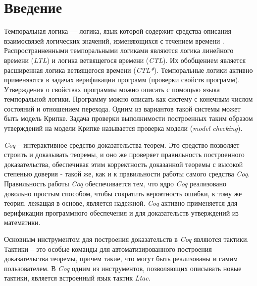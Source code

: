 \documentclass[12pt]{article}
\begin{document}
  \mdissPutTitleContents

  \section{Введение}
  
  
Темпоральная логика — логика, язык которой содержит средства описания взаимосвязей логических значений, изменяющихся с течением времени \cite{Clark}. Распространненными темпоральными логиками являются логика линейного времени (\textit{LTL}) и логика ветвящегося времени (\textit{CTL}). Их обобщением является расширенная логика ветвящегося времени (\textit{CTL*}). Темпоральные логики активно применяются в задачах верификации программ (проверки свойств программ). Утверждения о свойствах программы можно описать с помощью языка темпоральной логики. 
Программу можно описать как систему с конечным числом состояний и отношением перехода. Одним из вариантов такой системы может быть модель Крипке. Задача проверки выполнимости построенных таким образом утверждений на модели Крипке называется проверка модели (\textit{model checking}).

\textit{Coq} -- интерактивное средство доказательства теорем. Это средство позволяет строить и доказывать теоремы, и оно же проверяет правильность построенного доказательства, обеспечивая этим корректность доказанной теоремы с высокой степенью доверия - такой же, как и к правильности работы самого средства \textit{Coq}.
Правильность работы \textit{Coq} обеспечивается тем, что ядро \textit{Coq} реализовано довольно простым способом, чтобы сократить вероятность ошибки, к тому же теория, лежащая в основе, является надежной. 
\textit{Coq} активно применяется для верификации программного обеспечения \cite{CompCert} \cite{SoftwareFoundations6} и для доказательств утверждений из математики\cite{mathcomp}. 

Основным инструментом для построения доказательств в \textit{Coq} являются тактики. Тактики -- это особые команды для автоматизированного построения доказательства теоремы, причем такие, что могут быть реализованы и самим пользователем.
В \textit{Coq} одним из инструментов, позволяющих описывать новые тактики, является встроенный язык тактик \textit{Ltac}\cite{LtacRef}. 
\end{document}
